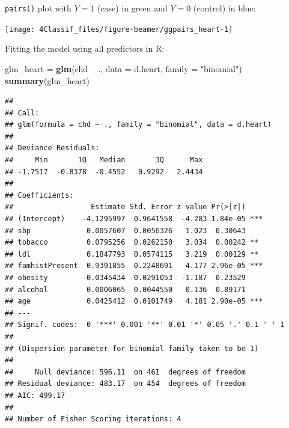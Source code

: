 \documentclass[10pt,ignorenonframetext,]{beamer}
\newenvironment{Shaded}{\begin{snugshade}}{\end{snugshade}}
\newcommand{\KeywordTok}[1]{\textcolor[rgb]{0.13,0.29,0.53}{\textbf{#1}}}
\newcommand{\DataTypeTok}[1]{\textcolor[rgb]{0.13,0.29,0.53}{#1}}
\newcommand{\StringTok}[1]{\textcolor[rgb]{0.31,0.60,0.02}{#1}}
\newcommand{\OperatorTok}[1]{\textcolor[rgb]{0.81,0.36,0.00}{\textbf{#1}}}
\newcommand{\NormalTok}[1]{#1}
\begin{document}
\begin{frame}[fragile]

\texttt{pairs()} plot with \(Y=1\) (case) in green and \(Y=0\) (control)
in blue:

\begin{center}\texttt{[image: 4Classif\_files/figure-beamer/ggpairs\_heart-1]} \end{center}

\end{frame}

\begin{frame}[fragile]

Fitting the model using all predictors in R:

\tiny

\begin{Shaded}
\begin{Highlighting}[]
\NormalTok{glm_heart =}\StringTok{ }\KeywordTok{glm}\NormalTok{(chd }\OperatorTok{~}\StringTok{ }\NormalTok{., }\DataTypeTok{data =}\NormalTok{ d.heart, }\DataTypeTok{family =} \StringTok{"binomial"}\NormalTok{)}
\KeywordTok{summary}\NormalTok{(glm_heart)}
\end{Highlighting}
\end{Shaded}

\begin{verbatim}
## 
## Call:
## glm(formula = chd ~ ., family = "binomial", data = d.heart)
## 
## Deviance Residuals: 
##     Min       1Q   Median       3Q      Max  
## -1.7517  -0.8378  -0.4552   0.9292   2.4434  
## 
## Coefficients:
##                  Estimate Std. Error z value Pr(>|z|)    
## (Intercept)    -4.1295997  0.9641558  -4.283 1.84e-05 ***
## sbp             0.0057607  0.0056326   1.023  0.30643    
## tobacco         0.0795256  0.0262150   3.034  0.00242 ** 
## ldl             0.1847793  0.0574115   3.219  0.00129 ** 
## famhistPresent  0.9391855  0.2248691   4.177 2.96e-05 ***
## obesity        -0.0345434  0.0291053  -1.187  0.23529    
## alcohol         0.0006065  0.0044550   0.136  0.89171    
## age             0.0425412  0.0101749   4.181 2.90e-05 ***
## ---
## Signif. codes:  0 '***' 0.001 '**' 0.01 '*' 0.05 '.' 0.1 ' ' 1
## 
## (Dispersion parameter for binomial family taken to be 1)
## 
##     Null deviance: 596.11  on 461  degrees of freedom
## Residual deviance: 483.17  on 454  degrees of freedom
## AIC: 499.17
## 
## Number of Fisher Scoring iterations: 4
\end{verbatim}

\end{frame}
\end{document}
